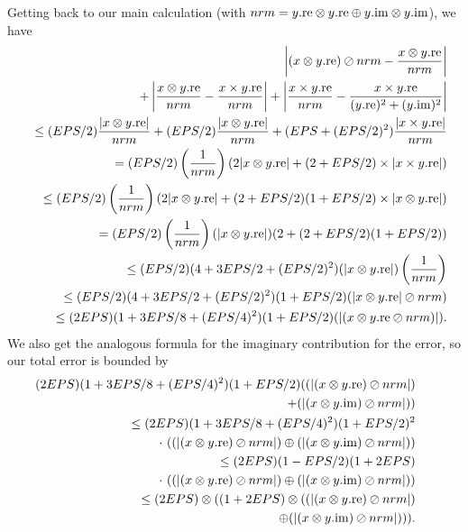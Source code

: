 \phantom{someone}
Getting back to our main calculation (with $nrm = y.{\rm re} \otimes y.{\rm re} \oplus y.{\rm im} \otimes y.{\rm im}$), we
have
\begin{eqnarray*}
&&\hskip-16pt\left|(x \otimes y.{\rm re}) \oslash nrm - {x \otimes y.{\rm re} \over nrm}\right|\\
&&\quad +
\left|{x \otimes y.{\rm re} \over nrm} - {x \times y.{\rm re} \over nrm}\right| +
\left|{x \times y.{\rm re} \over nrm} - 
{x \times y.{\rm re}  \over (y.{\rm re})^2 + (y.{\rm im})^2}\right|\\
&&  \le(EPS/2){|x \otimes y.{\rm re}| \over nrm} +
        (EPS/2){|x \otimes   y.{\rm re}| \over nrm} +
(EPS + (EPS/2)^2) {|x \times   y.{\rm re}| \over nrm}\\
&&  =(EPS/2)\left({1 \over nrm}\right)(2 |x \otimes y.{\rm re}| +
(2 + EPS/2) \times |x \times y.{\rm re}| )\\
&&  \le (EPS/2)\left({1 \over nrm}\right)(2 |x \otimes y.{\rm re}| +
(2 + EPS/2)(1 + EPS/2) \times |x \otimes y.{\rm re}| )\\
&&\quad = (EPS/2)\left({1 \over nrm}\right)(|x \otimes y.{\rm re}|)
(2 + (2 + EPS/2)(1+EPS/2))\\
&&  \le (EPS/2)(4 + 3EPS/2 + (EPS/2)^2)(|x \otimes y.{\rm re}|)\left({1 \over nrm}\right)\\
&& \le (EPS/2)(4 + 3EPS/2 +
(EPS/2)^2)(1+EPS/2)(|x \otimes y.{\rm re}| \oslash nrm)\\
&&  \le (2EPS)(1 + 3EPS/8 + (EPS/4)^2)(1+EPS/2)(|(x \otimes y.{\rm
re} \oslash nrm)|).
\end{eqnarray*}
 We also get the analogous formula for the imaginary contribution for the error, so our total error is
bounded by
\begin{eqnarray*}
&&\hskip-24pt (2EPS)(1 + 3EPS/8 + (EPS/4)^2)(1+EPS/2)((|(x \otimes y.{\rm re})\oslash nrm|)\\
&&\quad+(|(x \otimes y.{\rm
im})\oslash nrm|))\\
&& \le (2EPS)(1 + 3EPS/8 + (EPS/4)^2)(1+EPS/2)^2\\
&&\quad\cdot\ ((|(x \otimes y.{\rm re})\oslash nrm|)  \oplus (|(x \otimes
y.{\rm im})\oslash nrm|))\\
&&  \le (2EPS)(1 - EPS/2)(1+ 2EPS)\\
&&\quad\cdot\ ((|(x \otimes y.{\rm re})\oslash nrm|) \oplus (|(x \otimes y.{\rm
im})\oslash nrm|))\\
&&  \le (2EPS) \otimes ((1+ 2EPS) \otimes ((|(x \otimes y.{\rm re})\oslash nrm|)\\
&&\quad  \oplus (|(x \otimes y.{\rm
im})\oslash nrm|))).
\end{eqnarray*}

